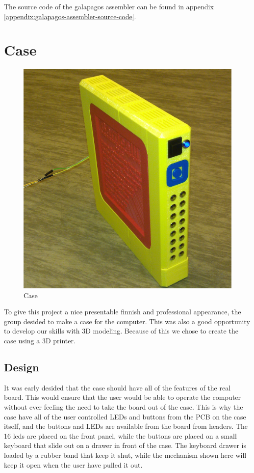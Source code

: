The source code of the \Gls{galapagos assembler} can be found in appendix \vref{appendix:galapagos-assembler-source-code}.

\section{Case}

\begin{figure}[H]
\includegraphics[width=\textwidth,keepaspectratio,clip]{additional-components/case.jpg}%
\caption{Case}
\end{figure}

To give this project a nice presentable finnish and professional appearance, the group desided to make a case for the computer.
This was also a good opportunity to develop our skills with 3D modeling.
Because of this we chose to create the case using a 3D printer.

\subsection {Design}

It was early desided that the case should have all of the features of the real board.
This would ensure that the user would be able to operate the computer without ever feeling the need to take the board out of the case.
This is why the case have all of the user controlled LEDs and buttons from the PCB on the case itself, and the buttons and LEDs are available from the board from headers.
The 16 leds are placed on the front panel, while the buttons are placed on a small keyboard that slide out on a drawer in front of the case.
The keyboard drawer is loaded by a rubber band that keep it shut, while the mechanism shown here will keep it open when the user have pulled it out.

